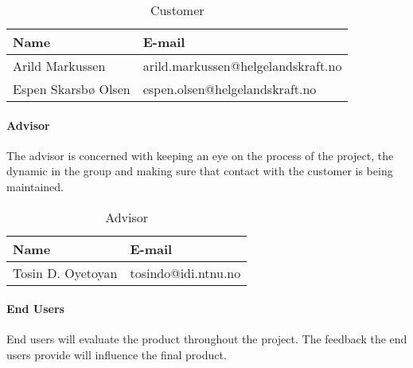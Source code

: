 \begin{table}[H]

\begin{center}
    \begin{tabular}{| l | l |}
   	\hline
    \rowcolor{gray}
    {\bf Name} & {\bf E-mail} \\ \hline
    Arild Markussen & arild.markussen@helgelandskraft.no \\ \hline
    Espen Skarsbø Olsen & espen.olsen@helgelandskraft.no \\
    \hline
    \end{tabular}
\end{center}

\caption{Customer}
\end{table}

\paragraph{Advisor}

The advisor is concerned with keeping an eye on the process of the project, the dynamic in the group and making sure that contact with the customer is being maintained. 

\begin{table}[H]

\begin{center}
    \begin{tabular}{| l | l |}
    \hline
    \rowcolor{gray}
    {\bf Name} & {\bf E-mail} \\ \hline
    Tosin D. Oyetoyan & tosindo@idi.ntnu.no \\
    \hline
    \end{tabular}
\end{center}

\caption{Advisor}
\end{table}

\paragraph{End Users}

End users will evaluate the product throughout the project. The feedback the end users provide will influence the final product.


